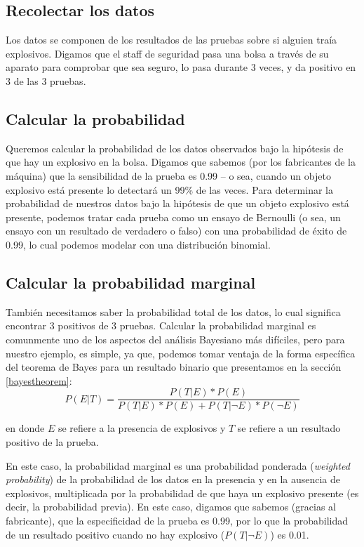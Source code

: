 \documentclass[
  12pt,
]{book}
\begin{document}
\hypertarget{recolectar-los-datos}{%
\subsection{Recolectar los datos}\label{recolectar-los-datos}}

Los datos se componen de los resultados de las pruebas sobre si alguien traía explosivos. Digamos que el staff de seguridad pasa una bolsa a través de su aparato para comprobar que sea seguro, lo pasa durante 3 veces, y da positivo en 3 de las 3 pruebas.

\hypertarget{calcular-la-probabilidad}{%
\subsection{Calcular la probabilidad}\label{calcular-la-probabilidad}}

Queremos calcular la probabilidad de los datos observados bajo la hipótesis de que hay un explosivo en la bolsa. Digamos que sabemos (por los fabricantes de la máquina) que la sensibilidad de la prueba es 0.99 -- o sea, cuando un objeto explosivo está presente lo detectará un 99\% de las veces. Para determinar la probabilidad de nuestros datos bajo la hipótesis de que un objeto explosivo está presente, podemos tratar cada prueba como un ensayo de Bernoulli (o sea, un ensayo con un resultado de verdadero o falso) con una probabilidad de éxito de 0.99, lo cual podemos modelar con una distribución binomial.

\hypertarget{calcular-la-probabilidad-marginal}{%
\subsection{Calcular la probabilidad marginal}\label{calcular-la-probabilidad-marginal}}

También necesitamos saber la probabilidad total de los datos, lo cual significa encontrar 3 positivos de 3 pruebas. Calcular la probabilidad marginal es comunmente uno de los aspectos del análisis Bayesiano más difíciles, pero para nuestro ejemplo, es simple, ya que, podemos tomar ventaja de la forma específica del teorema de Bayes para un resultado binario que presentamos en la sección \ref{bayestheorem}:
\[
P(E|T) = \frac{P(T|E)*P(E)}{P(T|E)*P(E) + P(T|\neg E)*P(\neg E)}
\]

en donde \(E\) se refiere a la presencia de explosivos y \(T\) se refiere a un resultado positivo de la prueba.

En este caso, la probabilidad marginal es una probabilidad ponderada (\emph{weighted probability}) de la probabilidad de los datos en la presencia y en la ausencia de explosivos, multiplicada por la probabilidad de que haya un explosivo presente (es decir, la probabilidad previa). En este caso, digamos que sabemos (gracias al fabricante), que la especificidad de la prueba es 0.99, por lo que la probabilidad de un resultado positivo cuando no hay explosivo (\(P(T|\neg E)\)) es 0.01.
\end{document}
